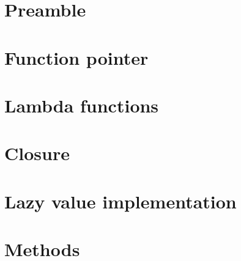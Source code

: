 \section{Preamble}

\section{Function pointer}
\label{sec:function_pointers}

\section{Lambda functions}
\label{sec:lambda}

\section{Closure}
\label{sec:closure}


\section{Lazy value implementation}
\label{sec:impl_lazy_closure}

\section{Methods}
\label{sec:method_delegates}
